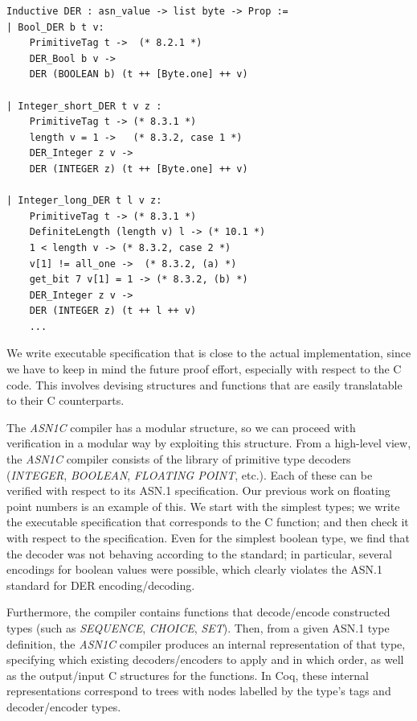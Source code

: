 \documentclass[10p,conference]{IEEEtran}
\begin{document}
\begin{lstlisting}[language=Coq]
Inductive DER : asn_value -> list byte -> Prop :=
| Bool_DER b t v:
    PrimitiveTag t ->  (* 8.2.1 *)
    DER_Bool b v ->
    DER (BOOLEAN b) (t ++ [Byte.one] ++ v)
      
| Integer_short_DER t v z : 
    PrimitiveTag t -> (* 8.3.1 *)
    length v = 1 ->   (* 8.3.2, case 1 *)  
    DER_Integer z v ->
    DER (INTEGER z) (t ++ [Byte.one] ++ v) 

| Integer_long_DER t l v z:
    PrimitiveTag t -> (* 8.3.1 *)         
    DefiniteLength (length v) l -> (* 10.1 *)
    1 < length v -> (* 8.3.2, case 2 *)
    v[1] != all_one ->  (* 8.3.2, (a) *)
    get_bit 7 v[1] = 1 -> (* 8.3.2, (b) *)
    DER_Integer z v ->
    DER (INTEGER z) (t ++ l ++ v) 
    ...

\end{lstlisting}

We write executable specification that is close to the actual implementation, since we have to keep in mind the future proof effort, especially with respect to
the C code. This involves devising structures and functions that are easily translatable to their C counterparts. 


The \emph{ASN1C} compiler has a modular structure, so we can proceed with
verification in a modular way by exploiting this structure. From a high-level view, the \emph{ASN1C} compiler consists of
the library of primitive type decoders (\emph{INTEGER}, \emph{BOOLEAN},
\emph{FLOATING POINT}, etc.). Each of these can be verified with respect to its
ASN.1 specification. Our previous work on floating point numbers is an example
of this. We start with the simplest types; we write the executable specification that corresponds to the C function; and then check it with respect to the specification. Even for the simplest boolean type, we find that the decoder was not behaving according to the standard; in particular, several encodings for boolean values were possible, which clearly violates the ASN.1 standard for DER encoding/decoding.


Furthermore, the compiler contains functions that decode/encode
constructed types (such as \emph{SEQUENCE}, \emph{CHOICE}, \emph{SET}). Then, from a
given ASN.1 type definition, the \emph{ASN1C} compiler produces an internal
representation of that type, specifying which existing
decoders/encoders to apply and in which order, as well as the
output/input C structures for the functions. In Coq,
these internal representations correspond to trees with nodes labelled by the
type's tags and decoder/encoder types.
\end{document}
